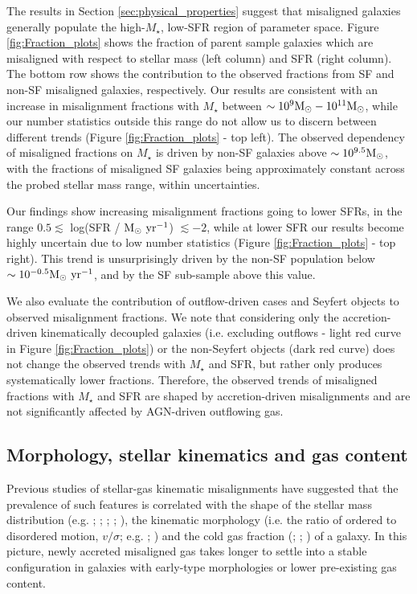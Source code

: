 \documentclass[fleqn,usenatbib]{mnras}
\begin{document}
The results in Section \ref{sec:physical_properties} suggest that misaligned galaxies generally populate the high-$M_{\star}$, low-SFR region of parameter space.
Figure \ref{fig:Fraction_plots} shows the fraction of parent sample galaxies which are misaligned with respect to stellar mass (left column) and SFR (right column). The bottom row shows the contribution to the observed fractions from SF and non-SF misaligned galaxies, respectively. Our results are consistent with an increase in misalignment fractions with $M_{\star}$ between $\sim 10^{9}\rm{M_{\odot}}-10^{11}\rm{M_{\odot}}$, while our number statistics outside this range do not allow us to discern between different trends (Figure \ref{fig:Fraction_plots} - top left). The observed dependency of misaligned fractions on $M_{\star}$ is driven by non-SF galaxies above $\sim10^{9.5}\rm{M_{\odot}}$, with  the fractions of misaligned SF galaxies being approximately constant across the probed stellar mass range, within uncertainties.

Our findings show increasing misalignment fractions going to lower SFRs, in the range  $0.5 \lesssim$ log(SFR / $\rm{M_{\odot}\ yr^{-1}}$) $\lesssim -2$, while at lower SFR our results become highly uncertain due to low number statistics (Figure \ref{fig:Fraction_plots} - top right). This trend is unsurprisingly driven by the non-SF population below $\sim 10^{-0.5}\rm{M_{\odot}\ yr^{-1}}$, and by the SF sub-sample above this value. 

We also evaluate the contribution of outflow-driven cases and Seyfert objects to observed misalignment fractions. We note that considering only the accretion-driven kinematically decoupled galaxies (i.e. excluding outflows - light red curve in Figure \ref{fig:Fraction_plots}) or the non-Seyfert objects (dark red curve) does not change the observed trends with $M_{\star}$ and SFR, but rather only produces systematically lower fractions. Therefore, the observed trends of misaligned fractions with $M_{\star}$ and SFR are shaped by accretion-driven misalignments and are not significantly affected by AGN-driven outflowing gas.

\subsection{Morphology, stellar kinematics and gas content}
\label{sec:distributions_results}

Previous studies of stellar-gas kinematic misalignments have suggested that the prevalence of such features is correlated with the shape of the stellar mass distribution (e.g. \citealt{Davis2011}; \citealt{CdpLagos2015}; \citealt{Bryant2019}; \citealt{Duckworth}; \citealt{Khim2020I}), the kinematic morphology (i.e. the ratio of ordered to disordered motion, $v/\sigma$; e.g. \citealt{Xu}; \citealt{Khim2020II}) and the cold gas fraction (\citealt{CdpLagos2015}; \citealt{Duckworth}; \citealt{Khim2020I}) of a galaxy.
In this picture, newly accreted misaligned gas takes longer to settle into a stable configuration in galaxies with early-type morphologies or lower pre-existing gas content. 
\end{document}
